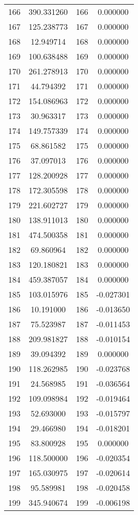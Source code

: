\documentclass[12pt]{article}
\begin{document}
\begin{longtable}{@{}cccc@{}}
166 & 390.331260 & 166 & 0.000000 \\
167 & 125.238773 & 167 & 0.000000 \\
168 & 12.949714 & 168 & 0.000000 \\
169 & 100.638488 & 169 & 0.000000 \\
170 & 261.278913 & 170 & 0.000000 \\
171 & 44.794392 & 171 & 0.000000 \\
172 & 154.086963 & 172 & 0.000000 \\
173 & 30.963317 & 173 & 0.000000 \\
174 & 149.757339 & 174 & 0.000000 \\
175 & 68.861582 & 175 & 0.000000 \\
176 & 37.097013 & 176 & 0.000000 \\
177 & 128.200928 & 177 & 0.000000 \\
178 & 172.305598 & 178 & 0.000000 \\
179 & 221.602727 & 179 & 0.000000 \\
180 & 138.911013 & 180 & 0.000000 \\
181 & 474.500358 & 181 & 0.000000 \\
182 & 69.860964 & 182 & 0.000000 \\
183 & 120.180821 & 183 & 0.000000 \\
184 & 459.387057 & 184 & 0.000000 \\
185 & 103.015976 & 185 & -0.027301 \\
186 & 10.191000 & 186 & -0.013650 \\
187 & 75.523987 & 187 & -0.011453 \\
188 & 209.981827 & 188 & -0.010154 \\
189 & 39.094392 & 189 & 0.000000 \\
190 & 118.262985 & 190 & -0.023768 \\
191 & 24.568985 & 191 & -0.036564 \\
192 & 109.098984 & 192 & -0.019464 \\
193 & 52.693000 & 193 & -0.015797 \\
194 & 29.466980 & 194 & -0.018201 \\
195 & 83.800928 & 195 & 0.000000 \\
196 & 118.500000 & 196 & -0.020354 \\
197 & 165.030975 & 197 & -0.020614 \\
198 & 95.589981 & 198 & -0.020458 \\
199 & 345.940674 & 199 & -0.006198 \\

\end{longtable}
\end{document}
